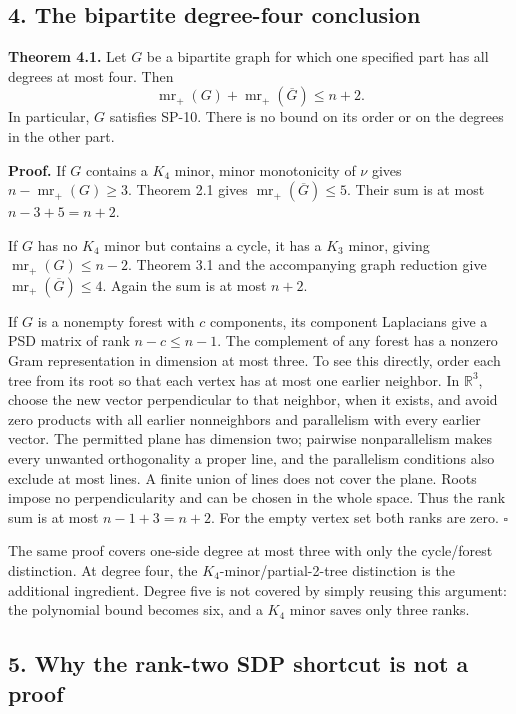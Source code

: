 \documentclass[
  10pt,
]{article}
\begin{document}
\subsection{4. The bipartite degree-four
conclusion}\label{the-bipartite-degree-four-conclusion}

\textbf{Theorem 4.1.} Let \(G\) be a bipartite graph for which one
specified part has all degrees at most four. Then \[
 \boxed{\operatorname{mr}_+(G)+\operatorname{mr}_+(\overline G)\le n+2.}
\] In particular, \(G\) satisfies SP-10. There is no bound on its order
or on the degrees in the other part.

\textbf{Proof.} If \(G\) contains a \(K_4\) minor, minor monotonicity of
\(\nu\) gives \(n-\operatorname{mr}_+(G)\ge3\). Theorem 2.1 gives
\(\operatorname{mr}_+(\overline G)\le5\). Their sum is at most
\(n-3+5=n+2\).

If \(G\) has no \(K_4\) minor but contains a cycle, it has a \(K_3\)
minor, giving \(\operatorname{mr}_+(G)\le n-2\). Theorem 3.1 and the
accompanying graph reduction give
\(\operatorname{mr}_+(\overline G)\le4\). Again the sum is at most
\(n+2\).

If \(G\) is a nonempty forest with \(c\) components, its component
Laplacians give a PSD matrix of rank \(n-c\le n-1\). The complement of
any forest has a nonzero Gram representation in dimension at most three.
To see this directly, order each tree from its root so that each vertex
has at most one earlier neighbor. In \(\mathbb R^3\), choose the new
vector perpendicular to that neighbor, when it exists, and avoid zero
products with all earlier nonneighbors and parallelism with every
earlier vector. The permitted plane has dimension two; pairwise
nonparallelism makes every unwanted orthogonality a proper line, and the
parallelism conditions also exclude at most lines. A finite union of
lines does not cover the plane. Roots impose no perpendicularity and can
be chosen in the whole space. Thus the rank sum is at most
\(n-1+3=n+2\). For the empty vertex set both ranks are zero. \(\square\)

The same proof covers one-side degree at most three with only the
cycle/forest distinction. At degree four, the
\(K_4\)-minor/partial-2-tree distinction is the additional ingredient.
Degree five is not covered by simply reusing this argument: the
polynomial bound becomes six, and a \(K_4\) minor saves only three
ranks.

\subsection{5. Why the rank-two SDP shortcut is not a
proof}\label{why-the-rank-two-sdp-shortcut-is-not-a-proof}
\end{document}
